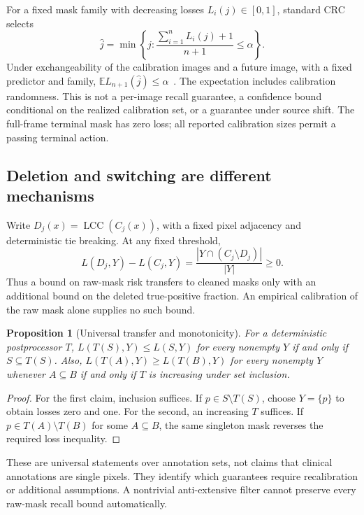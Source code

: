 \documentclass[11pt,a4paper]{article}
\newtheorem{proposition}{Proposition}
\newcommand{\LCC}{\operatorname{LCC}}
\newcommand{\E}{\mathbb{E}}
\begin{document}
For a fixed mask family with decreasing losses $L_i(j)\in[0,1]$, standard CRC selects
\begin{equation}
 \widehat j=\min\left\{j:\frac{\sum_{i=1}^{n}L_i(j)+1}{n+1}\le\alpha\right\}.
 \label{eq:crc}
\end{equation}
Under exchangeability of the calibration images and a future image, with a fixed predictor and family, $\E L_{n+1}(\widehat j)\le\alpha$~\cite{crc}. The expectation includes calibration randomness. This is not a per-image recall guarantee, a confidence bound conditional on the realized calibration set, or a guarantee under source shift. The full-frame terminal mask has zero loss; all reported calibration sizes permit a passing terminal action.

\subsection{Deletion and switching are different mechanisms}
Write $D_j(x)=\LCC(C_j(x))$, with a fixed pixel adjacency and deterministic tie breaking. At any fixed threshold,
\begin{equation}
 L(D_j,Y)-L(C_j,Y)=\frac{|Y\cap(C_j\setminus D_j)|}{|Y|}\ge0.
 \label{eq:deletion}
\end{equation}
Thus a bound on raw-mask risk transfers to cleaned masks only with an additional bound on the deleted true-positive fraction. An empirical calibration of the raw mask alone supplies no such bound.

\begin{proposition}[Universal transfer and monotonicity]
For a deterministic postprocessor $T$, $L(T(S),Y)\le L(S,Y)$ for every nonempty $Y$ if and only if $S\subseteq T(S)$. Also, $L(T(A),Y)\ge L(T(B),Y)$ for every nonempty $Y$ whenever $A\subseteq B$ if and only if $T$ is increasing under set inclusion.
\end{proposition}
\begin{proof}
For the first claim, inclusion suffices. If $p\in S\setminus T(S)$, choose $Y=\{p\}$ to obtain losses zero and one. For the second, an increasing $T$ suffices. If $p\in T(A)\setminus T(B)$ for some $A\subseteq B$, the same singleton mask reverses the required loss inequality.
\end{proof}
These are universal statements over annotation sets, not claims that clinical annotations are single pixels. They identify which guarantees require recalibration or additional assumptions. A nontrivial anti-extensive filter cannot preserve every raw-mask recall bound automatically.
\end{document}
